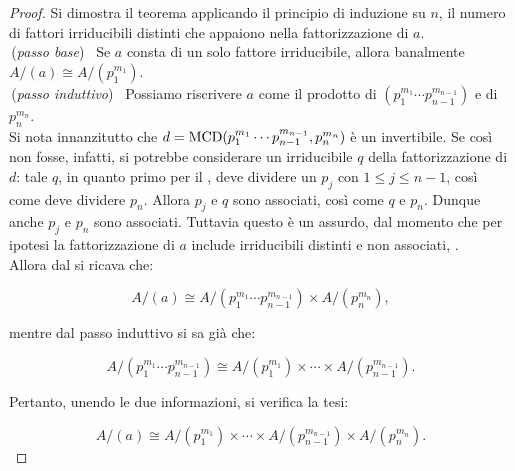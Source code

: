     \begin{proof}
        Si dimostra il teorema applicando il principio di induzione su $n$,
        il numero di fattori irriducibili distinti che appaiono
        nella fattorizzazione di $a$. \\
        
        \,(\textit{passo base}) \, Se $a$ consta di un solo fattore irriducibile,
        allora banalmente $A/(a) \cong A/(p_1^{m_1})$. \\
        
        \,(\textit{passo induttivo}) \, Possiamo riscrivere $a$ come
        il prodotto di $(p_1^{m_1}\cdots p_{n-1}^{m_{n-1}})$ e di
        $p_n^{m_n}$. \\
        
        Si nota innanzitutto che $d = \operatorname{MCD}(p_1^{m_1}\cdots p_{n-1}^{m_{n-1}}, p_n^{m_n})$
        è un invertibile. Se così non fosse, infatti, si potrebbe
        considerare un irriducibile $q$ della fattorizzazione di $d$:
        tale $q$, in quanto primo per il ,
        deve dividere un $p_j$ con $1 \leq j \leq n-1$, così
        come deve dividere $p_n$. Allora $p_j$ e $q$ sono associati,
        così come $q$ e $p_n$. Dunque anche $p_j$ e $p_n$ sono associati.
        Tuttavia questo è un assurdo, dal momento che per ipotesi
        la fattorizzazione di $a$ include irriducibili distinti e
        non associati, \Lightning{}. \\
        
        Allora dal  si ricava che:
        
        \[ A/(a) \cong A/(p_1^{m_1}\cdots p_{n-1}^{m_{n-1}}) \times A/(p_n^{m_n}), \]
        
        \vskip 0.1in
        
        mentre dal passo induttivo si sa già che:
        
        \[ A/(p_1^{m_1}\cdots p_{n-1}^{m_{n-1}}) \cong A/(p_1^{m_1}) \times \cdots \times A/(p_{n-1}^{m_{n-1}}). \]
        
        \vskip 0.1in
        
        Pertanto, unendo le due informazioni, si verifica la tesi:
        
            \[ A/(a) \cong
            A/(p_1^{m_1}) \times \cdots \times A/(p_{n-1}^{m_{n-1}}) \times A/(p_n^{m_n}). \]
        
    \end{proof}

